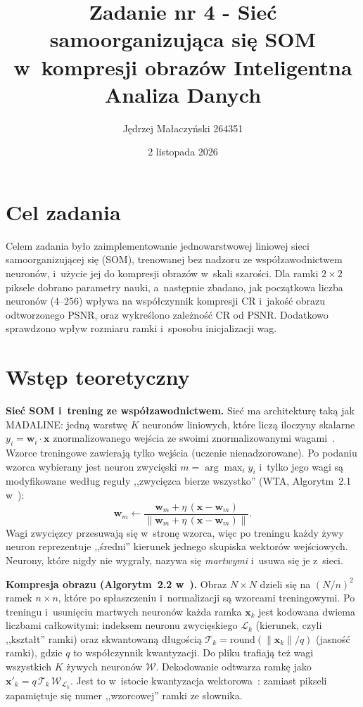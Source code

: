 \documentclass[12pt]{article}
\title{{\bf Zadanie nr 4 - Sieć samoorganizująca się SOM w~kompresji obrazów}\linebreak
Inteligentna Analiza Danych}
\author{Jędrzej Małaczyński 264351}
\date{2 listopada 2026}
\begin{document}
\clearpage\maketitle
\thispagestyle{empty}
\newpage
\setcounter{page}{1}
\section{Cel zadania}

Celem zadania było zaimplementowanie jednowarstwowej liniowej sieci samoorganizującej się (SOM),
trenowanej bez nadzoru ze współzawodnictwem neuronów, i~użycie jej do kompresji obrazów
w~skali szarości. Dla ramki $2\times2$ piksele dobrano parametry nauki, a~następnie zbadano,
jak początkowa liczba neuronów ($4$--$256$) wpływa na współczynnik kompresji CR i~jakość obrazu
odtworzonego PSNR, oraz wykreślono zależność CR od PSNR. Dodatkowo sprawdzono wpływ rozmiaru
ramki i~sposobu inicjalizacji wag.

\section{Wstęp teoretyczny}

\textbf{Sieć SOM i~trening ze współzawodnictwem.} Sieć ma architekturę taką jak MADALINE: jedną
warstwę $K$ neuronów liniowych, które liczą iloczyny skalarne $y_i=\mathbf{w}_i\cdot\mathbf{x}$
znormalizowanego wejścia ze swoimi znormalizowanymi wagami~\cite{wyklad3,kohonen1990}. Wzorce
treningowe zawierają tylko wejścia (uczenie nienadzorowane). Po podaniu wzorca wybierany jest
neuron zwycięski $m=\arg\max_i y_i$ i~tylko jego wagi są modyfikowane według reguły
,,zwycięzca bierze wszystko'' (WTA, Algorytm~2.1 w~\cite{wyklad3}):
\begin{equation}
 \mathbf{w}_m \leftarrow \frac{\mathbf{w}_m+\eta\,(\mathbf{x}-\mathbf{w}_m)}{\|\mathbf{w}_m+\eta\,(\mathbf{x}-\mathbf{w}_m)\|} .
 \label{eq_som}
\end{equation}
Wagi zwycięzcy przesuwają się w~stronę wzorca, więc po treningu każdy żywy neuron reprezentuje
,,średni'' kierunek jednego skupiska wektorów wejściowych. Neurony, które nigdy nie wygrały,
nazywa się \emph{martwymi} i~usuwa się je z~sieci.

\textbf{Kompresja obrazu (Algorytm~2.2 w~\cite{wyklad3}).} Obraz $N\times N$ dzieli się na
$(N/n)^2$ ramek $n\times n$, które po spłaszczeniu i~normalizacji są wzorcami treningowymi.
Po treningu i~usunięciu martwych neuronów każda ramka $\mathbf{x}_k$ jest kodowana dwiema liczbami
całkowitymi: indeksem neuronu zwycięskiego $\mathcal{L}_k$ (kierunek, czyli ,,kształt'' ramki) oraz
skwantowaną długością $\mathcal{T}_k=\mathrm{round}(\|\mathbf{x}_k\|/q)$ (jasność ramki), gdzie $q$ to
współczynnik kwantyzacji. Do pliku trafiają też wagi wszystkich $K$ żywych neuronów $\mathcal{W}$.
Dekodowanie odtwarza ramkę jako $\mathbf{x}'_k=q\,\mathcal{T}_k\,\mathcal{W}_{\mathcal{L}_k}$. Jest to
w~istocie kwantyzacja wektorowa~\cite{gray1984}: zamiast pikseli zapamiętuje się numer ,,wzorcowej''
ramki ze słownika.
\end{document}
